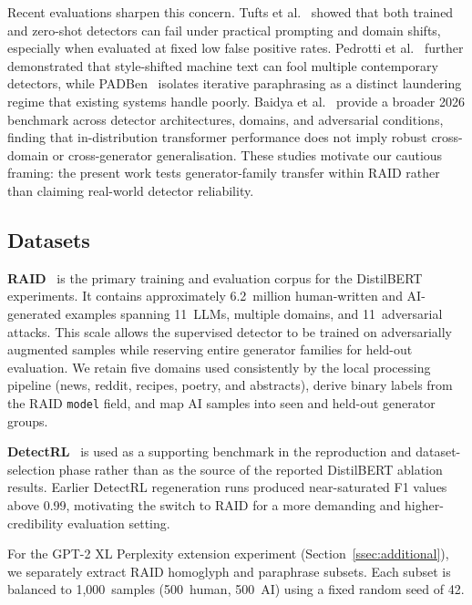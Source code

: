 \documentclass[conference]{IEEEtran}
\begin{document}
Recent evaluations sharpen this concern. Tufts et al.~\cite{tufts2025}
showed that both trained and zero-shot detectors can fail under practical
prompting and domain shifts, especially when evaluated at fixed low false
positive rates. Pedrotti et al.~\cite{pedrotti2025} further demonstrated that
style-shifted machine text can fool multiple contemporary detectors, while
PADBen~\cite{zha2025padben} isolates iterative paraphrasing as a distinct
laundering regime that existing systems handle poorly. Baidya et
al.~\cite{baidya2026} provide a broader 2026 benchmark across detector
architectures, domains, and adversarial conditions, finding that
in-distribution transformer performance does not imply robust cross-domain or
cross-generator generalisation. These studies motivate our cautious framing:
the present work tests generator-family transfer within RAID rather than
claiming real-world detector reliability.

\subsection{Datasets}

\textbf{RAID}~\cite{dugan2024} is the primary training and evaluation corpus
for the DistilBERT experiments. It contains approximately 6.2~million
human-written and AI-generated examples spanning 11~LLMs, multiple domains,
and 11~adversarial attacks. This scale allows the supervised detector to be
trained on adversarially augmented samples while reserving entire generator
families for held-out evaluation. We retain five domains used consistently
by the local processing pipeline (news, reddit, recipes, poetry, and
abstracts), derive binary labels from the RAID \texttt{model} field, and map
AI samples into seen and held-out generator groups.

\textbf{DetectRL}~\cite{wu2024detectrl} is used as a supporting benchmark in
the reproduction and dataset-selection phase rather than as the source of the
reported DistilBERT ablation results. Earlier DetectRL regeneration runs
produced near-saturated F1 values above 0.99, motivating the switch to RAID
for a more demanding and higher-credibility evaluation setting.

For the GPT-2 XL Perplexity extension experiment (Section~\ref{ssec:additional}),
we separately extract RAID homoglyph and paraphrase subsets. Each subset is
balanced to 1,000~samples (500~human, 500~AI) using a fixed random seed of 42.

\end{document}
